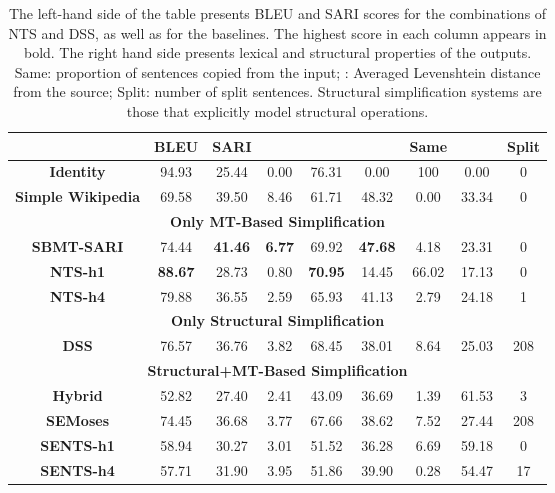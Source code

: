 \documentclass[11pt,a4paper]{article}
\begin{document}
\begin{center}
\begin{table*}[t]
\scriptsize
\centering
\begin{tabular}{|c|c|c|c|c|c||c|c|c|}
\hline
 & {\bf BLEU} & {\bf SARI} & {\bf } & {\bf } & {\bf } & {\bf  Same} &  & Split\\
\hline\hline
{\bf Identity} &  94.93 &25.44 & 0.00 &  76.31 & 0.00 & 100 & 0.00 & 0\\
\hline
{\bf Simple Wikipedia} & 69.58  &  39.50  &  8.46 & 61.71 &  48.32 & 0.00 & 33.34 & 0\\
 \hline\hline
 \multicolumn{9}{|c|}{{\bf Only MT-Based Simplification}}\\
\hline
{\bf SBMT-SARI} & 74.44 & {\bf 41.46} & {\bf 6.77} & 69.92 & {\bf 47.68} & 4.18 & 23.31 & 0\\
\hline
{\bf NTS-h1} &  {\bf 88.67} & 28.73 & 0.80 & {\bf 70.95} & 14.45 & 66.02 & 17.13 & 0\\
\hline
{\bf NTS-h4}&79.88 & 36.55 & 2.59 & 65.93 &  41.13 &2.79 & 24.18 & 1\\
\hline\hline
\multicolumn{9}{|c|}{{\bf Only Structural Simplification}}\\
\hline 
{\bf DSS} &76.57 &  36.76 & 3.82 & 68.45 & 38.01 & 8.64 & 25.03 & 208\\
\hline\hline
\multicolumn{9}{|c|}{{\bf Structural+MT-Based Simplification}}\\
\hline
{\bf\sc Hybrid} & 52.82 & 27.40 & 2.41 & 43.09 & 36.69 & 1.39 & 61.53 & 3\\
\hline
{\bf SEMoses} &74.45  &36.68 & 3.77 & 67.66 & 38.62 & 7.52 & 27.44 & 208\\
\hline    
{\bf SENTS-h1} &  58.94 & 30.27 & 3.01 & 51.52 & 36.28 & 6.69 & 59.18 & 0\\
\hline
{\bf SENTS-h4}& 57.71 &  31.90 & 3.95 &  51.86 & 39.90 & 0.28 & 54.47 & 17\\
\hline   
\end{tabular}
\vspace{-0.1cm}
\hfill
\caption{The left-hand side of the table presents BLEU and SARI scores for the combinations of NTS and DSS, as well as for the baselines.
The highest score in each column appears in bold. The right hand side presents lexical and structural properties of the outputs.
Same: proportion of sentences copied from the input; : Averaged Levenshtein distance from the source; Split: number of split sentences.
Structural simplification systems are those that explicitly model structural operations.}
\label{automatic_evaluation}
\end{table*}
\end{center}
\end{document}
